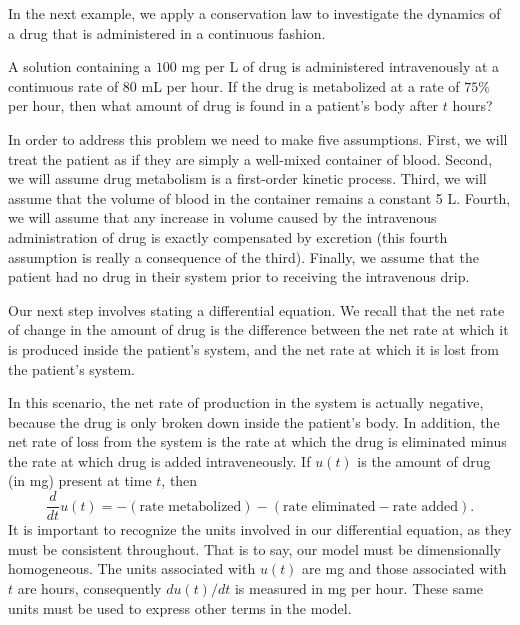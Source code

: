 \documentclass[../book.tex]{subfiles}
\begin{document}
In the next example, we apply a conservation law to investigate the dynamics of a drug that is administered in a continuous fashion.

\begin{example} \label{eg:drug2}
A solution containing a \(100\) mg per L of drug is administered intravenously at a continuous rate of \(80\) mL per hour. If the drug is metabolized at a rate of \(75 \%\) per hour, then what amount of drug is found in a patient's body after \(t\) hours?
\end{example}

\begin{solution}
In order to address this problem we need to make five assumptions. First, we will treat the patient as if they are simply a well-mixed container of blood. Second, we will assume drug metabolism is a first-order kinetic process. Third, we will assume that the volume of blood in the container remains a constant 5 L. Fourth, we will assume that any increase in volume caused by the intravenous administration of drug is exactly compensated by excretion (this fourth assumption is really a consequence of the third). Finally, we assume that the patient had no drug in their system prior to receiving the intravenous drip.

Our next step involves stating a differential equation. We recall that the net rate of change in the amount of drug is the difference between the net rate at which it is produced inside the patient's system, and the net rate at which it is lost from the patient's system.

In this scenario, the net rate of production in the system is actually negative, because the drug is only broken down inside the patient's body. In addition, the net rate of loss from the system is the rate at which the drug is eliminated minus the rate at which drug is added intraveneously. If \(u(t)\) is the amount of drug (in mg) present at time \(t\), then
\begin{equation}\label{eq:de-31}
\dfrac{d}{dt} u(t) = -(\text{rate metabolized}) 
- (\text{rate eliminated} - \text{rate added}).
\end{equation}
It is important to recognize the units involved in our differential equation, as they must be consistent throughout. That is to say, our model must be dimensionally homogeneous. The units associated with \(u(t)\) are mg and those associated with \(t\) are hours, consequently \(du(t)/dt\) is measured in mg per hour. These same units must be used to express other terms in the model.


\end{solution}
\end{document}
